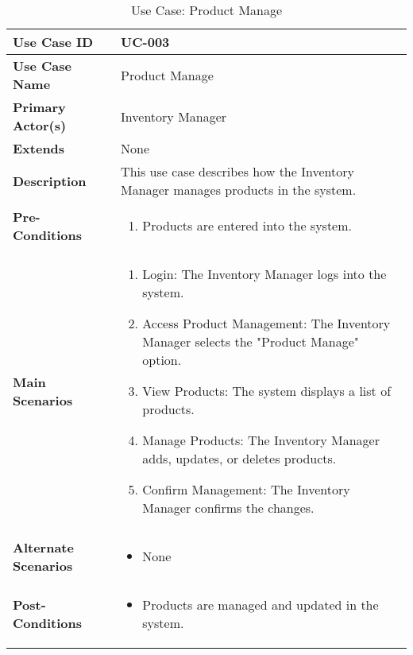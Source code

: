 \documentclass{article}
\begin{document}
\begin{table}[!ht]
    \centering
    \renewcommand{\arraystretch}{1.3} %
    \begin{tabularx}{\textwidth}{|l|X|}
        \hline
        \textbf{Use Case ID} & UC-003 \\
        \hline
        \textbf{Use Case Name} & Product Manage \\
        \hline
        \textbf{Primary Actor(s)} & Inventory Manager \\
        \hline
        \textbf{Extends} & None \\
        \hline
        \textbf{Description} & This use case describes how the Inventory Manager manages products in the system. \\
        \hline
        \textbf{Pre-Conditions} & 
        \begin{enumerate}[label=\arabic*.,itemsep=0pt]
            \item Products are entered into the system.
        \end{enumerate} \\
        \hline
        \textbf{Main Scenarios} & 
        \begin{enumerate}[label=\arabic*.,itemsep=0pt]
            \item Login: The Inventory Manager logs into the system.
            \item Access Product Management: The Inventory Manager selects the "Product Manage" option.
            \item View Products: The system displays a list of products.
            \item Manage Products: The Inventory Manager adds, updates, or deletes products.
            \item Confirm Management: The Inventory Manager confirms the changes.
        \end{enumerate} \\
        \hline
        \textbf{Alternate Scenarios} & 
        \begin{itemize}[label=--,itemsep=0pt]
            \item None
        \end{itemize} \\
        \hline
        \textbf{Post-Conditions} & 
        \begin{itemize}[label=--,itemsep=0pt]
            \item Products are managed and updated in the system.
        \end{itemize} \\
        \hline
    \end{tabularx}
    \caption{Use Case: Product Manage}
    \label{tab:use-case-product-manage}
\end{table}
\end{document}
